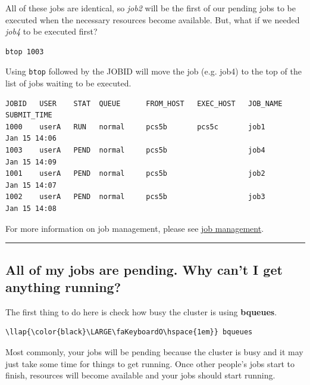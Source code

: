 \documentclass[11pt]{article}
\begin{document}
    All of these jobs are identical, so \textit{job2} will be the first of our
pending jobs to be executed when the necessary resources become
available. But, what if we needed \textit{job4} to be executed first?

    \begin{verbatim}
btop 1003
\end{verbatim}

    Using \texttt{btop} followed by the JOBID will move the job (e.g. job4)
to the top of the list of jobs waiting to be executed.

    \begin{verbatim}
JOBID   USER    STAT  QUEUE      FROM_HOST   EXEC_HOST   JOB_NAME   SUBMIT_TIME
1000    userA   RUN   normal     pcs5b       pcs5c       job1       Jan 15 14:06
1003    userA   PEND  normal     pcs5b                   job4       Jan 15 14:09
1001    userA   PEND  normal     pcs5b                   job2       Jan 15 14:07
1002    userA   PEND  normal     pcs5b                   job3       Jan 15 14:08
\end{verbatim}

    For more information on job management, please see
\href{job_management.ipynb}{job management}.

    \begin{center}\rule{0.5\linewidth}{\linethickness}\end{center}

    \subsection{All of my jobs are pending. Why can't I get anything
running?}\label{all-of-my-jobs-are-pending.-why-cant-i-get-anything-running}

The first thing to do here is check how busy the cluster is using
\textbf{bqueues}.

\begin{terminalinput}
\begin{Verbatim}[commandchars=\\\{\}]
\llap{\color{black}\LARGE\faKeyboardO\hspace{1em}} bqueues
\end{Verbatim}
\end{terminalinput}


    Most commonly, your jobs will be pending because the cluster is busy and
it may just take some time for things to get running. Once other
people's jobs start to finish, resources will become available and your
jobs should start running.
\end{document}
